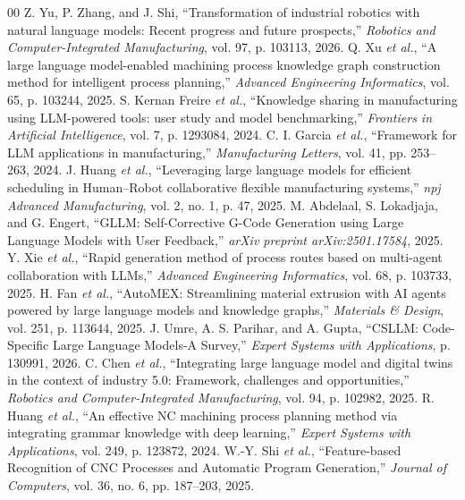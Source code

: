 \documentclass[journal,twoside,web]{ieeecolor}
\begin{document}
\begin{thebibliography}{00}
 Z. Yu, P. Zhang, and J. Shi, ``Transformation of industrial robotics with natural language models: Recent progress and future prospects,'' \emph{Robotics and Computer-Integrated Manufacturing}, vol. 97, p. 103113, 2026.
 Q. Xu \emph{et al.}, ``A large language model-enabled machining process knowledge graph construction method for intelligent process planning,'' \emph{Advanced Engineering Informatics}, vol. 65, p. 103244, 2025.
 S. Kernan Freire \emph{et al.}, ``Knowledge sharing in manufacturing using LLM-powered tools: user study and model benchmarking,'' \emph{Frontiers in Artificial Intelligence}, vol. 7, p. 1293084, 2024.
 C. I. Garcia \emph{et al.}, ``Framework for LLM applications in manufacturing,'' \emph{Manufacturing Letters}, vol. 41, pp. 253--263, 2024.
 J. Huang \emph{et al.}, ``Leveraging large language models for efficient scheduling in Human--Robot collaborative flexible manufacturing systems,'' \emph{npj Advanced Manufacturing}, vol. 2, no. 1, p. 47, 2025.
 M. Abdelaal, S. Lokadjaja, and G. Engert, ``GLLM: Self-Corrective G-Code Generation using Large Language Models with User Feedback,'' \emph{arXiv preprint arXiv:2501.17584}, 2025.
 Y. Xie \emph{et al.}, ``Rapid generation method of process routes based on multi-agent collaboration with LLMs,'' \emph{Advanced Engineering Informatics}, vol. 68, p. 103733, 2025.
 H. Fan \emph{et al.}, ``AutoMEX: Streamlining material extrusion with AI agents powered by large language models and knowledge graphs,'' \emph{Materials \& Design}, vol. 251, p. 113644, 2025.
 J. Umre, A. S. Parihar, and A. Gupta, ``CSLLM: Code-Specific Large Language Models-A Survey,'' \emph{Expert Systems with Applications}, p. 130991, 2026.
 C. Chen \emph{et al.}, ``Integrating large language model and digital twins in the context of industry 5.0: Framework, challenges and opportunities,'' \emph{Robotics and Computer-Integrated Manufacturing}, vol. 94, p. 102982, 2025.
 R. Huang \emph{et al.}, ``An effective NC machining process planning method via integrating grammar knowledge with deep learning,'' \emph{Expert Systems with Applications}, vol. 249, p. 123872, 2024.
 W.-Y. Shi \emph{et al.}, ``Feature-based Recognition of CNC Processes and Automatic Program Generation,'' \emph{Journal of Computers}, vol. 36, no. 6, pp. 187--203, 2025.

\end{thebibliography}
\end{document}
